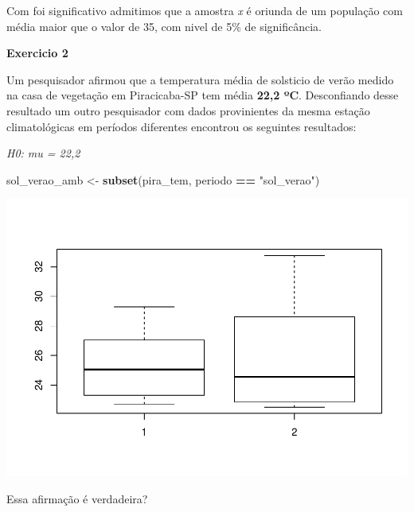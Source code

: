 \documentclass[
]{book}
\newenvironment{Shaded}{\begin{snugshade}}{\end{snugshade}}
\newcommand{\KeywordTok}[1]{\textcolor[rgb]{0.13,0.29,0.53}{\textbf{#1}}}
\newcommand{\NormalTok}[1]{#1}
\newcommand{\OperatorTok}[1]{\textcolor[rgb]{0.81,0.36,0.00}{\textbf{#1}}}
\newcommand{\StringTok}[1]{\textcolor[rgb]{0.31,0.60,0.02}{#1}}
\begin{document}
Com foi significativo admitimos que a amostra \emph{x} é oriunda de um população com média maior que o valor de 35, com nivel de 5\% de significância.

\textbf{Exercicio 2}

Um pesquisador afirmou que a temperatura média de solsticio de verão medido na casa de vegetação em Piracicaba-SP tem média \textbf{22,2 ºC}.
Desconfiando desse resultado um outro pesquisador com dados provinientes da mesma estação climatológicas em períodos diferentes encontrou os seguintes resultados:

\emph{H0: mu = 22,2}

\begin{Shaded}
\begin{Highlighting}[]
\NormalTok{  sol_verao_amb <-}\StringTok{ }\KeywordTok{subset}\NormalTok{(pira_tem, periodo }\OperatorTok{==}\StringTok{ "sol_verao"}\NormalTok{)}
\end{Highlighting}
\end{Shaded}

\begin{Shaded}
\end{Shaded}

\includegraphics{TudodoR_files/figure-latex/unnamed-chunk-255-1.pdf}

Essa afirmação é verdadeira?
\end{document}
